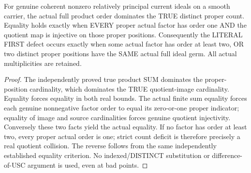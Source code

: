 \begin{theorem}
\label{hir:sharp-actual-chronological-distinct-defect-witness}
\leanok
For genuine coherent nonzero relatively principal current ideals on a
smooth carrier, the actual full product order dominates the TRUE distinct
proper count. Equality holds exactly when EVERY proper actual factor has
order one AND the quotient map is injective on those proper positions.
Consequently the LITERAL FIRST defect occurs exactly when some actual
factor has order at least two, OR two distinct proper positions have the
SAME actual full ideal germ. All actual multiplicities are retained.
\end{theorem}
\begin{proof}
The independently proved true product SUM dominates the proper-position
cardinality, which dominates the TRUE quotient-image cardinality. Equality
forces equality in both real bounds. The actual finite sum equality forces
each genuine nonnegative factor order to equal its zero-or-one proper
indicator; equality of image and source cardinalities forces genuine
quotient injectivity. Conversely these two facts yield the actual equality.
If no factor has order at least two, every proper actual order is one;
strict count deficit is therefore precisely a real quotient collision.
The reverse follows from the same independently established equality
criterion. No indexed/DISTINCT substitution or difference-of-USC argument
is used, even at bad points.
\end{proof}

